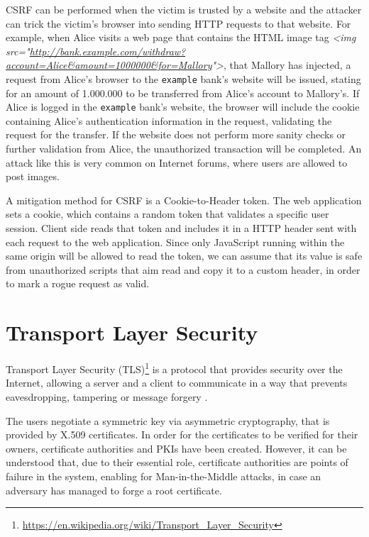 CSRF can be performed when the victim is trusted by a website and the attacker
can trick the victim's browser into sending HTTP requests to that website. For
example, when Alice visits a web page that contains the HTML image tag
\textit{<img
src="\url{http://bank.example.com/withdraw?account=Alice&amount=1000000&for=Mallory}">},
that Mallory has injected, a request from Alice's browser to the
\texttt{example} bank's website will be issued, stating for an amount of
1.000.000 to be transferred from Alice's account to Mallory's. If Alice is
logged in the \texttt{example} bank's website, the browser will include the
cookie containing Alice's authentication information in the request, validating
the request for the transfer. If the website does not perform more sanity checks
or further validation from Alice, the unauthorized transaction will be
completed. An attack like this is very common on Internet forums, where users
are allowed to post images.

A mitigation method for CSRF is a Cookie-to-Header token. The web application
sets a cookie, which contains a random token that validates a specific user
session. Client side reads that token and includes it in a HTTP header sent with
each request to the web application. Since only JavaScript running within the
same origin will be allowed to read the token, we can assume that its value is
safe from unauthorized scripts that aim read and copy it to a custom header, in
order to mark a rogue request as valid.

\section{Transport Layer Security}\label{sec:tls}

Transport Layer Security
(TLS)\footnote{\url{https://en.wikipedia.org/wiki/Transport_Layer_Security}} is
a protocol that provides security over the Internet, allowing a server and a
client to communicate in a way that prevents eavesdropping, tampering or message
forgery \cite{tls12}.

The users negotiate a symmetric key via asymmetric cryptography, that is
provided by X.509 certificates. In order for the certificates to be verified for
their owners, certificate authorities and PKIs have been created. However, it
can be understood that, due to their essential role, certificate authorities are
points of failure in the system, enabling for Man-in-the-Middle attacks, in case
an adversary has managed to forge a root certificate.

